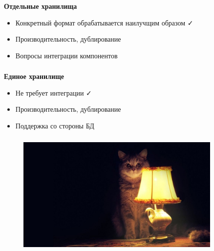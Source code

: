\documentclass[usenames,dvipsnames, 18pt, compress, aspectratio=169]{beamer}
\def\check{\textcolor{check}{\FA \faCheck}}
\def\fail{\textcolor{fail}{\FA \faRemove}}
\def\question{\textcolor{question}{\FA \faSearch}}
\begin{document}
\begin{frame}
    \frametitle{}
    \begin{center}
        \textbf{Отдельные хранилища}
        \pause
        \begin{itemize}[label={\MVRightarrow}]
            \item <+-> Конкретный формат обрабатывается наилучщим образом \check
            \item <+-> Производительность, дублирование \question
            \item <+-> Вопросы интеграции компонентов \fail
        \end{itemize}
    \end{center}
\end{frame}

\begin{frame}
    \frametitle{}
    \begin{center}
        \textbf{Единое хранилище}
        \pause
        \begin{itemize}[label={\MVRightarrow}]
            \item <+-> Не требует интеграции \check
            \item <+-> Производительность, дублирование \question
            \item <+-> Поддержка со стороны БД \question
        \end{itemize}
    \end{center}
\end{frame}

\begin{frame}
    \frametitle{}
    \begin{center}
    \begin{figure}
        \includegraphics[width=0.9\textwidth,center]{cat_stories.jpg}
    \end{figure}
    \end{center}
\end{frame}
\end{document}
